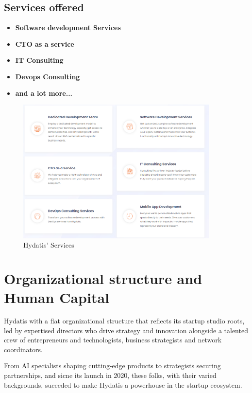 \documentclass[12pt,a4paper,oneside,english]{book}
\begin{document}
{\subsection{Services offered}
\begin{itemize}
    \item \textbf {Software development Services}
    \item \textbf{CTO as a service}
    \item \textbf{IT Consulting}
    \item \textbf{Devops Consulting}
    \item \textbf{and a lot more...}
\end{itemize}
\begin{figure}[h!]
    \centering
    \includegraphics[width=0.9\textwidth]{images/services_hydatis.png}
    \caption{Hydatis' Services}
    \label{fig:Services_hydatis}
\end{figure}

\section{Organizational structure and Human Capital} %
Hydatis with a flat organizational structure that reflects its startup studio roots, led by  expertised directors who drive strategy and innovation alongside a talented crew of entrepreneurs and technologists, business strategists and network coordinators.

From AI specialists shaping cutting-edge products to strategists securing partnerships, and sicne its launch in 2020, these folks, with their varied backgrounds, suceeded to make Hydatis a powerhouse in the startup ecosystem.


}
\end{document}
